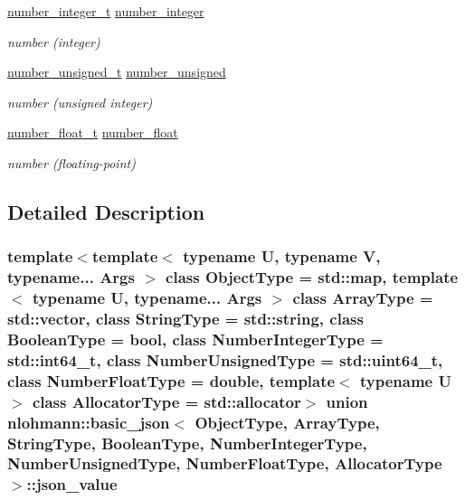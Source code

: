 \begin{DoxyCompactItemize}
\hypertarget{unionnlohmann_1_1basic__json_1_1json__value_a13022b922a2a10896e4682949f2c7e49}{}\label{unionnlohmann_1_1basic__json_1_1json__value_a13022b922a2a10896e4682949f2c7e49} 
\hyperlink{classnlohmann_1_1basic__json_ac4b10b2364f26ce47bdb9a413ff04a59}{number\+\_\+integer\+\_\+t} \hyperlink{unionnlohmann_1_1basic__json_1_1json__value_a13022b922a2a10896e4682949f2c7e49}{number\+\_\+integer}
\begin{DoxyCompactList}\small\item\em number (integer) \end{DoxyCompactList}\item 
\hypertarget{unionnlohmann_1_1basic__json_1_1json__value_ab19d47585930aa4d85c8e539e9402418}{}\label{unionnlohmann_1_1basic__json_1_1json__value_ab19d47585930aa4d85c8e539e9402418} 
\hyperlink{classnlohmann_1_1basic__json_a60a04166c122072ab11eaf9845d9cd1d}{number\+\_\+unsigned\+\_\+t} \hyperlink{unionnlohmann_1_1basic__json_1_1json__value_ab19d47585930aa4d85c8e539e9402418}{number\+\_\+unsigned}
\begin{DoxyCompactList}\small\item\em number (unsigned integer) \end{DoxyCompactList}\item 
\hypertarget{unionnlohmann_1_1basic__json_1_1json__value_acdedc3de7fbc1ae912f5918730658ec0}{}\label{unionnlohmann_1_1basic__json_1_1json__value_acdedc3de7fbc1ae912f5918730658ec0} 
\hyperlink{classnlohmann_1_1basic__json_a74a0013e847fdc574b48f931f0e757e1}{number\+\_\+float\+\_\+t} \hyperlink{unionnlohmann_1_1basic__json_1_1json__value_acdedc3de7fbc1ae912f5918730658ec0}{number\+\_\+float}
\begin{DoxyCompactList}\small\item\em number (floating-\/point) \end{DoxyCompactList}\end{DoxyCompactItemize}


\subsection{Detailed Description}
\subsubsection*{template$<$template$<$ typename U, typename V, typename... Args $>$ class Object\+Type = std\+::map, template$<$ typename U, typename... Args $>$ class Array\+Type = std\+::vector, class String\+Type = std\+::string, class Boolean\+Type = bool, class Number\+Integer\+Type = std\+::int64\+\_\+t, class Number\+Unsigned\+Type = std\+::uint64\+\_\+t, class Number\+Float\+Type = double, template$<$ typename U $>$ class Allocator\+Type = std\+::allocator$>$\newline
union nlohmann\+::basic\+\_\+json$<$ Object\+Type, Array\+Type, String\+Type, Boolean\+Type, Number\+Integer\+Type, Number\+Unsigned\+Type, Number\+Float\+Type, Allocator\+Type $>$\+::json\+\_\+value}

